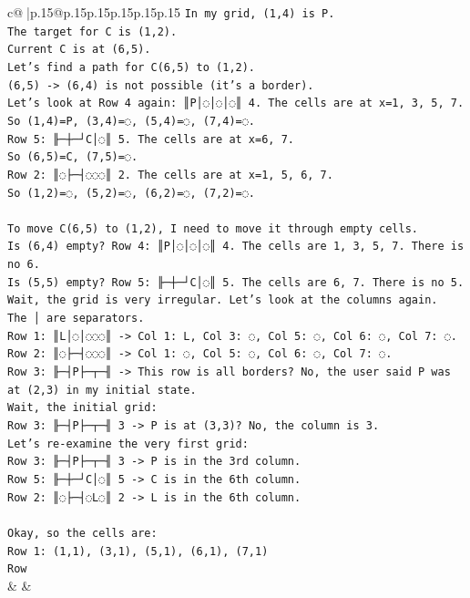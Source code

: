 \documentclass{article}
\begin{document}
{\begin{supertabular}{c@{$\;$}|p{.15\linewidth}@{}p{.15\linewidth}p{.15\linewidth}p{.15\linewidth}p{.15\linewidth}p{.15\linewidth}}
{{{\texttt{In my grid, (1,4) is P.} \\
\texttt{The target for C is (1,2).} \\
\texttt{Current C is at (6,5).} \\
\texttt{Let's find a path for C(6,5) to (1,2).} \\
\texttt{(6,5) {-}> (6,4) is not possible (it's a border).} \\
\texttt{Let's look at Row 4 again: ║P│◌│◌│◌║ 4. The cells are at x=1, 3, 5, 7.} \\
\texttt{So (1,4)=P, (3,4)=◌, (5,4)=◌, (7,4)=◌.} \\
\texttt{Row 5: ╟─┼─┘C│◌║ 5. The cells are at x=6, 7.} \\
\texttt{So (6,5)=C, (7,5)=◌.} \\
\texttt{Row 2: ║◌├─┤◌◌◌║ 2. The cells are at x=1, 5, 6, 7.} \\
\texttt{So (1,2)=◌, (5,2)=◌, (6,2)=◌, (7,2)=◌.} \\
\\ 
\texttt{To move C(6,5) to (1,2), I need to move it through empty cells.} \\
\texttt{Is (6,4) empty? Row 4: ║P│◌│◌│◌║ 4. The cells are 1, 3, 5, 7. There is no 6.} \\
\texttt{Is (5,5) empty? Row 5: ╟─┼─┘C│◌║ 5. The cells are 6, 7. There is no 5.} \\
\texttt{Wait, the grid is very irregular. Let's look at the columns again.} \\
\texttt{The │ are separators.} \\
\texttt{Row 1: ║L│◌│◌◌◌║ {-}> Col 1: L, Col 3: ◌, Col 5: ◌, Col 6: ◌, Col 7: ◌.} \\
\texttt{Row 2: ║◌├─┤◌◌◌║ {-}> Col 1: ◌, Col 5: ◌, Col 6: ◌, Col 7: ◌.} \\
\texttt{Row 3: ╟─┤P├─┬─╢ {-}> This row is all borders? No, the user said P was at (2,3) in my initial state.} \\
\texttt{Wait, the initial grid:} \\
\texttt{Row 3: ╟─┤P├─┬─╢ 3 {-}> P is at (3,3)? No, the column is 3.} \\
\texttt{Let's re{-}examine the very first grid:} \\
\texttt{Row 3: ╟─┤P├─┬─╢ 3 {-}> P is in the 3rd column.} \\
\texttt{Row 5: ╟─┼─┘C│◌║ 5 {-}> C is in the 6th column.} \\
\texttt{Row 2: ║◌├─┤◌L◌║ 2 {-}> L is in the 6th column.} \\
\\ 
\texttt{Okay, so the cells are:} \\
\texttt{Row 1: (1,1), (3,1), (5,1), (6,1), (7,1)} \\
\texttt{Row} \\
            }
        }
    }
    & & \\ \\


\end{supertabular}}
\end{document}
